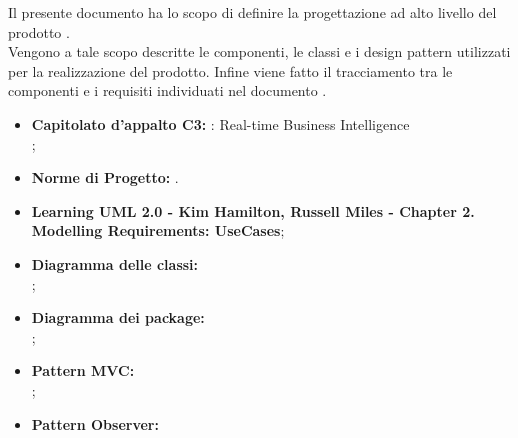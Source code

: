 
		Il presente documento ha lo scopo di definire la progettazione ad alto livello del prodotto \projectname{}.\\
		Vengono a tale scopo descritte le componenti, le classi e i design pattern utilizzati per la realizzazione del prodotto. Infine viene fatto il tracciamento tra le componenti e i requisiti individuati nel documento .

	

		\begin{itemize}
			\item\textbf{Capitolato d'appalto C3:} \projectname{}: Real-time Business Intelligence \\
				;
			\item \textbf{Norme di Progetto:} .
		\end{itemize}
		\begin{itemize}
			\item \textbf{Learning UML 2.0 - Kim Hamilton, Russell Miles - Chapter 2. Modelling Requirements: UseCases};
			\item \textbf{Diagramma delle classi:} \\ ;
			\item \textbf{Diagramma dei package:} \\ ;
			\item \textbf{Pattern MVC:} \\ ;
			\item \textbf{Pattern Observer:} \\ 
			
		\end{itemize}
